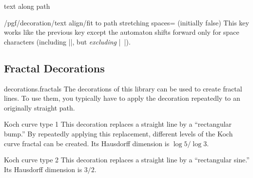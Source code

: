\begin{decoration}{text along path}
\begin{key}{/pgf/decoration/text align/fit to path stretching spaces= (initially false)}
  This key works like the previous key except the automaton
  shifts forward only for space characters (including |\space|, but
  \emph{excluding} |\ |).

\begin{codeexample}[]
\end{codeexample}
\end{key}

\end{decoration}




\subsection{Fractal Decorations}

\begin{pgflibrary}{decorations.fractals}
  The decorations of this library can be used to create fractal
  lines. To use them, you typically have to apply the decoration
  repeatedly to an originally straight path.
\end{pgflibrary}


\begin{decoration}{Koch curve type 1}
  This decoration replaces a straight line by a ``rectangular bump.''
  By repeatedly applying this replacement, different levels of the
  Koch curve fractal can be created. Its Hausdorff dimension is $\log
  5/\log 3$.
\begin{codeexample}[]
\end{codeexample}
\end{decoration}


\begin{decoration}{Koch curve type 2}
  This decoration replaces a straight line by a ``rectangular sine.''
  Its Hausdorff dimension is $3/2$.
\begin{codeexample}[]
\end{codeexample}
\end{decoration}

